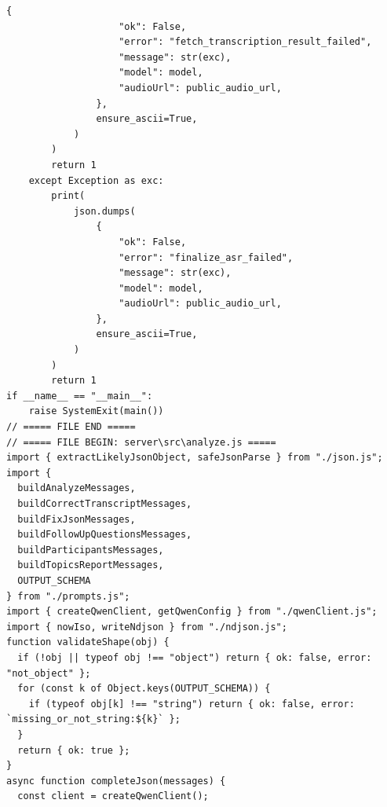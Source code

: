\documentclass[12pt,a4paper]{article}
\begin{document}
\begin{Verbatim}[fontsize=\footnotesize]
                {
                    "ok": False,
                    "error": "fetch_transcription_result_failed",
                    "message": str(exc),
                    "model": model,
                    "audioUrl": public_audio_url,
                },
                ensure_ascii=True,
            )
        )
        return 1
    except Exception as exc:
        print(
            json.dumps(
                {
                    "ok": False,
                    "error": "finalize_asr_failed",
                    "message": str(exc),
                    "model": model,
                    "audioUrl": public_audio_url,
                },
                ensure_ascii=True,
            )
        )
        return 1
if __name__ == "__main__":
    raise SystemExit(main())
// ===== FILE END =====
// ===== FILE BEGIN: server\src\analyze.js =====
import { extractLikelyJsonObject, safeJsonParse } from "./json.js";
import {
  buildAnalyzeMessages,
  buildCorrectTranscriptMessages,
  buildFixJsonMessages,
  buildFollowUpQuestionsMessages,
  buildParticipantsMessages,
  buildTopicsReportMessages,
  OUTPUT_SCHEMA
} from "./prompts.js";
import { createQwenClient, getQwenConfig } from "./qwenClient.js";
import { nowIso, writeNdjson } from "./ndjson.js";
function validateShape(obj) {
  if (!obj || typeof obj !== "object") return { ok: false, error: "not_object" };
  for (const k of Object.keys(OUTPUT_SCHEMA)) {
    if (typeof obj[k] !== "string") return { ok: false, error: `missing_or_not_string:${k}` };
  }
  return { ok: true };
}
async function completeJson(messages) {
  const client = createQwenClient();
\end{Verbatim}
\newpage
{}
\fancyhead[R]{}
\end{document}
